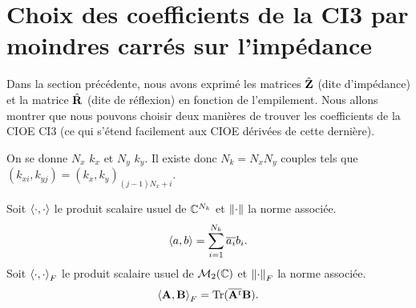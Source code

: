 \section[Choix 1 des coefficients de la CI3]{Choix des coefficients de la CI3 par moindres carrés sur l'impédance}

  Dans la section précédente, nous avons exprimé les matrices \(\hat{\mathbf{Z}}\) (dite d'impédance) et la matrice \(\hat{\mathbf{R}}\) (dite de réflexion) en fonction de l'empilement.
  Nous allons montrer que nous pouvons choisir deux manières de trouver les coefficients de la CIOE CI3 (ce qui s’étend facilement aux CIOE dérivées de cette dernière). 

  On se donne \(N_x\) \(k_x\) et \(N_y\) \(k_y\).
  Il existe donc \(N_k=N_xN_y\) couples tels que \((k_{xi},k_{yj}) = (k_x,k_y)_{(j-1)N_x+i}\).

  \begin{defn}
    Soit \(\left<{\cdot},{\cdot}\right>\) le produit scalaire usuel de \(\mathbb C^{N_{k}}\) et \(\left\lVert\cdot\right\rVert\) la norme associée.
    \begin{equation*}
      \left<{a},{b}\right> = \sum_{i=1}^{N_k} {\overline{a_i}} b_i.
    \end{equation*}
    Soit \(\left<{\cdot},{\cdot}\right>_F\) le produit scalaire usuel de \(\mathcal{M}_2(\mathbb C)\) et \(\left\lVert\cdot\right\rVert_F\) la norme associée.
    \begin{equation*}
      \left<{\mathbf{A}},{\mathbf{B}}\right>_F = \operatorname{Tr}({\overline{\mathbf{A}^t}}\mathbf{B}).
    \end{equation*}
  \end{defn}

